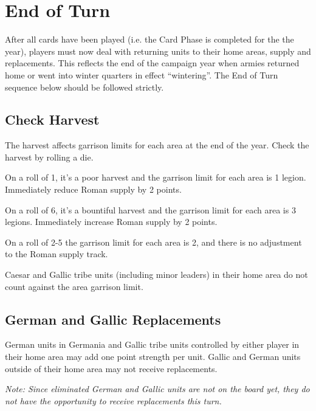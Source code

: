 \section{End of Turn}
\par
After all cards have been played (i.e. the Card Phase is completed for the the year), players must now deal with returning units to their home areas, supply and replacements. This reflects the end of the campaign year when armies returned home or went into winter quarters in effect “wintering”. The End of Turn sequence below should be followed strictly.

\subsection{Check Harvest}
\par
The harvest affects garrison limits for each area at the end of the year. Check the harvest by rolling a die.

On a roll of 1, it’s a poor harvest and the garrison limit for each area is 1 legion. Immediately reduce Roman supply by 2 points.

On a roll of 6, it’s a bountiful harvest and the garrison limit for each area is 3 legions. Immediately increase Roman supply by 2 points.

On a roll of 2-5 the garrison limit for each area is 2, and there is no adjustment to the Roman supply track.

Caesar and Gallic tribe units (including minor leaders) in their home area do not count against the area garrison limit.

\raggedbottom

\subsection{German and Gallic Replacements}
\par
German units in Germania and Gallic tribe units controlled by either player in their home area may add one point strength per unit. Gallic and German units outside of their home area may not receive replacements.

\textit{Note: Since eliminated German and Gallic units are not on the board yet, they do not have the opportunity to receive replacements this turn.}

